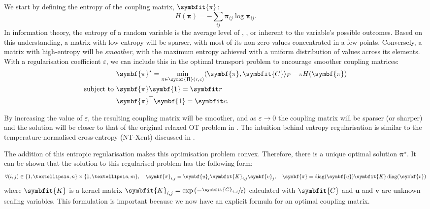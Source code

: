 We start by defining the entropy of the coupling matrix, $\symbfit{\pi}$:
\begin{equation}
    H(\symbf{\pi}) = -\sum_{ij}\symbf{\pi}_{ij}\log\symbf{\pi}_{ij}.
\end{equation}
In information theory, the entropy of a random variable is the average level of , , or  inherent to the variable's possible outcomes. Based on this understanding, a matrix with low entropy will be sparser, with most of its non-zero values concentrated in a few points. Conversely, a matrix with high-entropy will be \textit{smoother}, with the maximum entropy achieved with a uniform distribution of values across its elements. With a regularisation coefficient $\varepsilon$, we can include this in the optimal transport problem to encourage smoother coupling matrices:
\begin{align}
& \symbf{\pi}^\star = \min_{\pi \in \symbf{\Pi}(r, c)}\langle\symbf{\pi},\symbfit{C}\rangle_{F} -\varepsilon H(\symbf{\pi})\\
\text{subject to } &\symbf{\pi}\symbf{1} = \bfitr \nonumber\\
&\symbf{\pi}^{\top}\symbf{1} = \bfitc. \nonumber
\end{align}

By increasing the value of $\varepsilon$, the resulting coupling matrix will be smoother, and as $\varepsilon \rightarrow 0$ the coupling matrix will be sparser (or sharper) and the solution will be closer to that of the original relaxed OT problem in . The intuition behind entropy regularisation is similar to the temperature-normalised cross-entropy (NT-Xent) discussed in .

The addition of this entropic regularisation makes this optimisation problem convex. Therefore, there is a unique optimal solution $\symbf{\pi}^\star$. It can be shown that the solution to this regularised problem has the following form:
\begin{equation}
    \forall (i,j) \in \{1,…,n\}\times \{1, …, m\},\quad \symbf{\pi}_{i,j} = \symbf{u}_i \symbfit{K}_{i,j} \symbf{v}_j, \quad \symbf{\pi} = \operatorname{diag}(\symbf{u}) \symbfit{K} \operatorname{diag}(\symbf{v})
    \label{eqn:ot-mat-scaling}
\end{equation}
where $\symbfit{K}$ is a kernel matrix $\symbfit{K}_{i,j}=\exp{(-\sfrac{\symbfit{C}_{i,j}}{\varepsilon})}$ calculated with $\symbfit{C}$ and $\symbf{u}$ and $\symbf{v}$ are unknown scaling variables. This formulation is important because we now have an explicit formula for an optimal coupling matrix.

